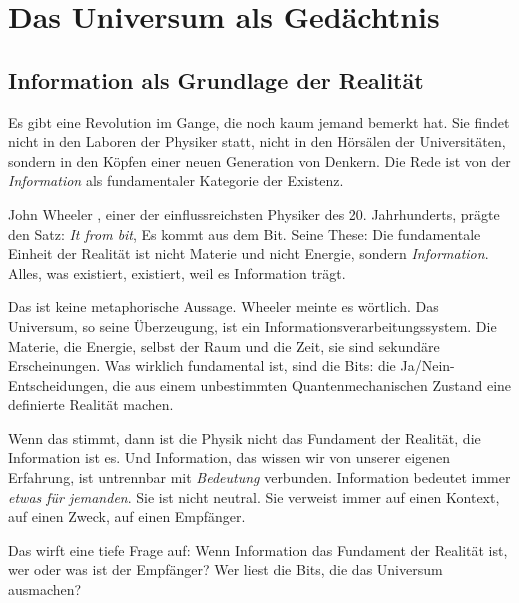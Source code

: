 
\chapter{Das Universum als Gedächtnis}

\section{Information als Grundlage der Realität}

Es gibt eine Revolution im Gange, die noch kaum jemand bemerkt hat. Sie findet nicht in den Laboren der Physiker statt, nicht in den Hörsälen der Universitäten, sondern in den Köpfen einer neuen Generation von Denkern. Die Rede ist von der \emph{Information} als fundamentaler Kategorie der Existenz.

John Wheeler \cite{Wheeler1990}, einer der einflussreichsten Physiker des 20. Jahrhunderts, prägte den Satz: \emph{\glqq It from bit\grqq{}}, \glqq Es kommt aus dem Bit\grqq{}. Seine These: Die fundamentale Einheit der Realität ist nicht Materie und nicht Energie, sondern \emph{Information}. Alles, was existiert, existiert, weil es Information trägt.

Das ist keine metaphorische Aussage. Wheeler meinte es wörtlich. Das Universum, so seine Überzeugung, ist ein Informationsverarbeitungssystem. Die Materie, die Energie, selbst der Raum und die Zeit, sie sind sekundäre Erscheinungen. Was wirklich fundamental ist, sind die Bits: die Ja/Nein-Entscheidungen, die aus einem unbestimmten Quantenmechanischen Zustand eine definierte Realität machen.

Wenn das stimmt, dann ist die Physik nicht das Fundament der Realität, die Information ist es. Und Information, das wissen wir von unserer eigenen Erfahrung, ist untrennbar mit \emph{Bedeutung} verbunden. Information bedeutet immer \emph{etwas für jemanden}. Sie ist nicht neutral. Sie verweist immer auf einen Kontext, auf einen Zweck, auf einen Empfänger.

Das wirft eine tiefe Frage auf: Wenn Information das Fundament der Realität ist, wer oder was ist der Empfänger? Wer \glqq liest\grqq{} die Bits, die das Universum ausmachen?

